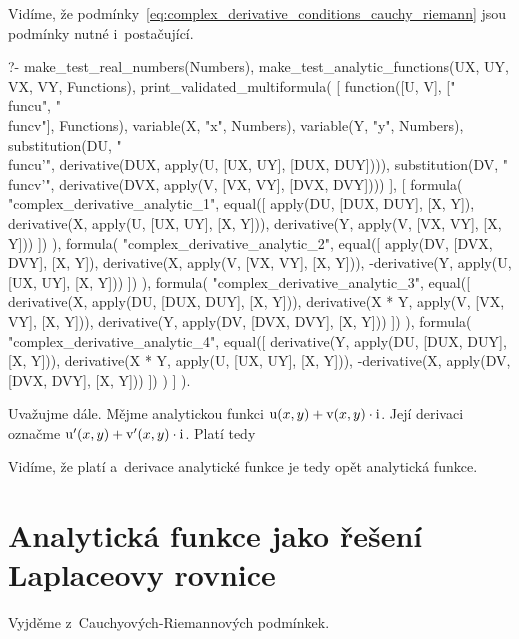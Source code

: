 Vidíme, že podmínky~\eqref{eq:complex_derivative_conditions_cauchy_riemann} jsou podmínky nutné i~postačující.

\begin{prolog}
?-	make_test_real_numbers(Numbers),
	make_test_analytic_functions(UX, UY, VX, VY, Functions),
	print_validated_multiformula(
		[
			function([U, V], ["\\func{u}", "\\func{v}"], Functions), 
			variable(X, "x", Numbers),
			variable(Y, "y", Numbers),
			substitution(DU, "\\func{u'}", derivative(DUX, apply(U, [UX, UY], [DUX, DUY]))),
			substitution(DV, "\\func{v'}", derivative(DVX, apply(V, [VX, VY], [DVX, DVY])))
		],
		[
			formula(
				"complex_derivative_analytic_1",
				equal([
					apply(DU, [DUX, DUY], [X, Y]),
					derivative(X, apply(U, [UX, UY], [X, Y])),
					derivative(Y, apply(V, [VX, VY], [X, Y]))
				])
			),
			formula(
				"complex_derivative_analytic_2",
				equal([
					apply(DV, [DVX, DVY], [X, Y]),
					derivative(X, apply(V, [VX, VY], [X, Y])),
					-derivative(Y, apply(U, [UX, UY], [X, Y]))
				])
			),
			formula(
				"complex_derivative_analytic_3",
				equal([
					derivative(X, apply(DU, [DUX, DUY], [X, Y])),
					derivative(X * Y, apply(V, [VX, VY], [X, Y])),
					derivative(Y, apply(DV, [DVX, DVY], [X, Y]))	
				])
			),
			formula(
				"complex_derivative_analytic_4",
				equal([
					derivative(Y, apply(DU, [DUX, DUY], [X, Y])),
					derivative(X * Y, apply(U, [UX, UY], [X, Y])),
					-derivative(X, apply(DV, [DVX, DVY], [X, Y]))	
				])
			)
		]
	).
\end{prolog}

Uvažujme dále. Mějme analytickou funkci \(\mathrm{u}(x, y) + \mathrm{v}(x, y) \cdot \mathrm{i}\). Její derivaci označme \(\mathrm{u'}(x, y) + \mathrm{v'}(x, y) \cdot \mathrm{i}\). Platí tedy

Vidíme, že platí
a~derivace analytické funkce je tedy opět analytická funkce.

\section{Analytická funkce jako řešení Laplaceovy rovnice}
\label{sec:complex_analytical_laplace}

Vyjděme z~Cauchyových-Riemannových podmínkek.

